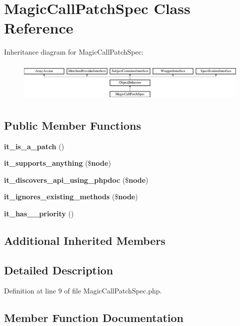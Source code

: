 \section{Magic\+Call\+Patch\+Spec Class Reference}
\label{classspec_1_1_prophecy_1_1_doubler_1_1_class_patch_1_1_magic_call_patch_spec}
Inheritance diagram for Magic\+Call\+Patch\+Spec\+:\begin{figure}[H]
\begin{center}
\leavevmode
\includegraphics[height=1.953488cm]{classspec_1_1_prophecy_1_1_doubler_1_1_class_patch_1_1_magic_call_patch_spec}
\end{center}
\end{figure}
\subsection*{Public Member Functions}
\begin{DoxyCompactItemize}
\item 
{\bf it\+\_\+is\+\_\+a\+\_\+patch} ()
\item 
{\bf it\+\_\+supports\+\_\+anything} (\${\bf node})
\item 
{\bf it\+\_\+discovers\+\_\+api\+\_\+using\+\_\+phpdoc} (\${\bf node})
\item 
{\bf it\+\_\+ignores\+\_\+existing\+\_\+methods} (\${\bf node})
\item 
{\bf it\+\_\+has\+\_\+\_\+priority} ()
\end{DoxyCompactItemize}
\subsection*{Additional Inherited Members}


\subsection{Detailed Description}


Definition at line 9 of file Magic\+Call\+Patch\+Spec.\+php.



\subsection{Member Function Documentation}
